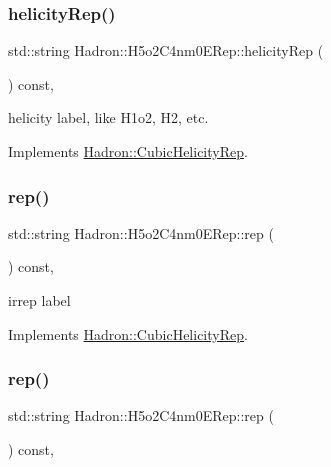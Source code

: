 \subsubsection{\texorpdfstring{helicityRep()}{helicityRep()}\hspace{0.1cm}{\footnotesize\ttfamily [3/3]}}
{\footnotesize\ttfamily std\+::string Hadron\+::\+H5o2\+C4nm0\+E\+Rep\+::helicity\+Rep (\begin{DoxyParamCaption}{ }\end{DoxyParamCaption}) const\hspace{0.3cm}{\ttfamily [inline]}, {\ttfamily [virtual]}}

helicity label, like H1o2, H2, etc. 

Implements \mbox{\hyperlink{structHadron_1_1CubicHelicityRep_af1096946b7470edf0a55451cc662f231}{Hadron\+::\+Cubic\+Helicity\+Rep}}.

\mbox{\label{structHadron_1_1H5o2C4nm0ERep_a72959e5415b9a2c1a841e0c35b4c1045}} 
\subsubsection{\texorpdfstring{rep()}{rep()}\hspace{0.1cm}{\footnotesize\ttfamily [1/3]}}
{\footnotesize\ttfamily std\+::string Hadron\+::\+H5o2\+C4nm0\+E\+Rep\+::rep (\begin{DoxyParamCaption}{ }\end{DoxyParamCaption}) const\hspace{0.3cm}{\ttfamily [inline]}, {\ttfamily [virtual]}}

irrep label 

Implements \mbox{\hyperlink{structHadron_1_1CubicHelicityRep_a8cdd86f068a167dc96faef02bfb8a33d}{Hadron\+::\+Cubic\+Helicity\+Rep}}.

\mbox{\label{structHadron_1_1H5o2C4nm0ERep_a72959e5415b9a2c1a841e0c35b4c1045}} 
\subsubsection{\texorpdfstring{rep()}{rep()}\hspace{0.1cm}{\footnotesize\ttfamily [2/3]}}
{\footnotesize\ttfamily std\+::string Hadron\+::\+H5o2\+C4nm0\+E\+Rep\+::rep (\begin{DoxyParamCaption}{ }\end{DoxyParamCaption}) const\hspace{0.3cm}{\ttfamily [inline]}, {\ttfamily [virtual]}}

